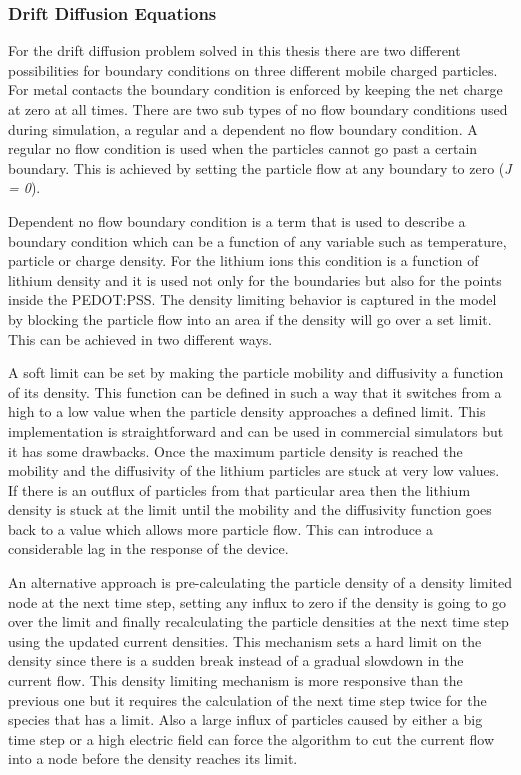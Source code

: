 \begin{doublespace}
\subsubsection{Drift Diffusion Equations}

For the drift diffusion problem solved in this thesis there are two different possibilities for boundary conditions on three different mobile charged particles. For metal contacts the boundary condition is enforced by keeping the net charge at zero at all times. There are two sub types of no flow boundary conditions used during simulation, a regular and a dependent no flow boundary condition. A regular no flow condition is used when the particles cannot go past a certain boundary. This is achieved by setting the particle flow at any boundary to zero (\textit{J = 0}). 

Dependent no flow boundary condition is a term that is used to describe a boundary condition which can be a function of any variable such as temperature, particle or charge density. For the lithium ions this condition is a function of lithium density and it is used not only for the boundaries but also for the points inside the PEDOT:PSS. The density limiting behavior is captured in the model by blocking the particle flow into an area if the density will go over a set limit. This can be achieved in two different ways. 

A soft limit can be set by making the particle mobility and diffusivity a function of its density. This function can be defined in such a way that it switches from a high to a low value when the particle density approaches a defined limit. This implementation is straightforward and can be used in commercial simulators but it has some drawbacks. Once the maximum particle density is reached the mobility and the diffusivity of the lithium particles are stuck at very low values. If there is an outflux of particles from that particular area then the lithium density is stuck at the limit until the mobility and the diffusivity function goes back to a value which allows more particle flow. This can introduce a considerable lag in the response of the device.  

An alternative approach is pre-calculating the particle density of a density limited node at the next time step, setting any influx to zero if the density is going to go over the limit and finally recalculating the particle densities at the next time step using the updated current densities. This mechanism sets a hard limit on the density since there is a sudden break instead of a gradual slowdown in the current flow. This density limiting mechanism is more responsive than the previous one but it requires the calculation of the next time step twice for the species that has a limit. Also a large influx of particles caused by either a big time step or a high electric field can force the algorithm to cut the current flow into a node before the density reaches its limit.


\end{doublespace}
